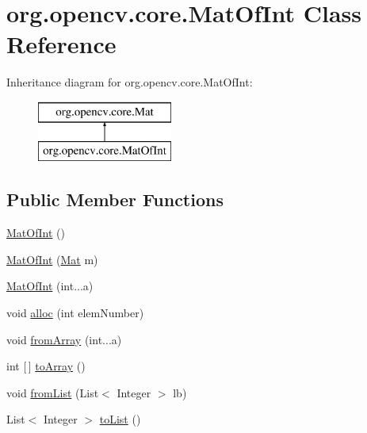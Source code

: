 \hypertarget{classorg_1_1opencv_1_1core_1_1_mat_of_int}{}\section{org.\+opencv.\+core.\+Mat\+Of\+Int Class Reference}
\label{classorg_1_1opencv_1_1core_1_1_mat_of_int}
Inheritance diagram for org.\+opencv.\+core.\+Mat\+Of\+Int\+:\begin{figure}[H]
\begin{center}
\leavevmode
\includegraphics[height=2.000000cm]{classorg_1_1opencv_1_1core_1_1_mat_of_int}
\end{center}
\end{figure}
\subsection*{Public Member Functions}
\begin{DoxyCompactItemize}
\item 
\mbox{\hyperlink{classorg_1_1opencv_1_1core_1_1_mat_of_int_a2cbf6720675cdbc1ffe48411ce5b310a}{Mat\+Of\+Int}} ()
\item 
\mbox{\hyperlink{classorg_1_1opencv_1_1core_1_1_mat_of_int_a7910a5c6e11588551ceced4b1074457c}{Mat\+Of\+Int}} (\mbox{\hyperlink{classorg_1_1opencv_1_1core_1_1_mat}{Mat}} m)
\item 
\mbox{\hyperlink{classorg_1_1opencv_1_1core_1_1_mat_of_int_a13eede90a5aa900ee50195cc7a730296}{Mat\+Of\+Int}} (int...\+a)
\item 
void \mbox{\hyperlink{classorg_1_1opencv_1_1core_1_1_mat_of_int_a0831b2bee6e896468d6d8ef9bdb5c30a}{alloc}} (int elem\+Number)
\item 
void \mbox{\hyperlink{classorg_1_1opencv_1_1core_1_1_mat_of_int_a8a1be476145e373faa685cd065342230}{from\+Array}} (int...\+a)
\item 
int \mbox{[}$\,$\mbox{]} \mbox{\hyperlink{classorg_1_1opencv_1_1core_1_1_mat_of_int_adaf6c489a50ae64dc8f1f2a92f5c3fc0}{to\+Array}} ()
\item 
void \mbox{\hyperlink{classorg_1_1opencv_1_1core_1_1_mat_of_int_aa215e09d6f197af77b05aa5155a4f538}{from\+List}} (List$<$ Integer $>$ lb)
\item 
List$<$ Integer $>$ \mbox{\hyperlink{classorg_1_1opencv_1_1core_1_1_mat_of_int_a5000394652df3fbbf922978a1d4a2bc7}{to\+List}} ()
\end{DoxyCompactItemize}
